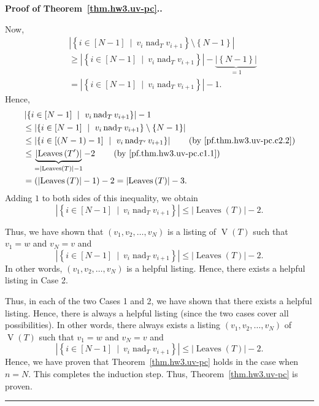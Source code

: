 \documentclass[numbers=enddot,12pt,final,onecolumn,notitlepage]{scrartcl}%
\theoremstyle{definition}
\newenvironment{proof}[1][Proof]{\noindent\textbf{#1.} }{\ \rule{0.5em}{0.5em}}
\newcommand{\set}[1]{\left\{ #1 \right\}}
\newcommand{\abs}[1]{\left| #1 \right|}
\newcommand{\tup}[1]{\left( #1 \right)}
\newcommand{\ive}[1]{\left[ #1 \right]}
\newcommand{\verts}[1]{\operatorname{V}\left( #1 \right)}
\newcommand{\leaves}[1]{\operatorname{Leaves}\left( #1 \right)}
\begin{document}
\begin{proof}[Proof of Theorem~\ref{thm.hw3.uv-pc}.]
\begin{itemize}
        Now,
        \begin{align*}
        &\abs{\set{i \in \ive{N-1} \ \mid \ v_i \operatorname{nad}_T v_{i+1} }
             \setminus \set{N-1}} \\
        &\geq \abs{\set{i \in \ive{N-1} \ \mid \ v_i \operatorname{nad}_T v_{i+1} }}
         - \underbrace{\abs{\set{N-1}}}_{= 1} \\
        &= \abs{\set{i \in \ive{N-1} \ \mid \ v_i \operatorname{nad}_T v_{i+1} }} - 1 .
        \end{align*}
        Hence, %
        \begin{align*}
        &\abs{\set{i \in \ive{N-1} \ \mid \ v_i \operatorname{nad}_T v_{i+1} }} - 1 \\
        &\leq \abs{\set{i \in \ive{N-1} \ \mid \ v_i \operatorname{nad}_T v_{i+1} }
             \setminus \set{N-1}} \\
        &\leq
        \abs{\set{i \in \ive{\tup{N-1}-1} \ \mid \ v_i \operatorname{nad}_{T'} v_{i+1} }}
        \qquad \left(\text{by \eqref{pf.thm.hw3.uv-pc.c2.2}}\right)
        \\
        &\leq
        \underbrace{\abs{\leaves{T'}}}_{= \abs{\leaves{T}} - 1} - 2
        \qquad \left(\text{by \eqref{pf.thm.hw3.uv-pc.c1.1}}\right) \\
        &= \tup{\abs{\leaves{T}} - 1} - 2 = \abs{\leaves{T}} - 3.
        \end{align*}
        Adding $1$ to both sides of this inequality, we obtain
        \[
        \abs{\set{i \in \ive{N-1} \ \mid \ v_i \operatorname{nad}_T v_{i+1} }}
        \leq \abs{\leaves{T}} - 2 .
        \]
        
        Thus, we have shown that $\tup{v_1, v_2, \ldots, v_N}$ is a
        listing of $\verts{T}$ such that $v_1 = w$ and $v_N = v$ and
        \[
        \abs{\set{i \in \ive{N-1} \ \mid \ v_i \operatorname{nad}_T v_{i+1} }}
        \leq \abs{\leaves{T}} - 2.
        \]
        In other words, $\tup{v_1, v_2, \ldots, v_N}$ is a helpful
        listing.
        Hence, there exists a helpful listing in Case 2.
\end{itemize}

Thus, in each of the two Cases 1 and 2, we have shown that there
exists a helpful listing.
Hence, there is always a helpful listing (since the two cases cover
all possibilities).
In other words, there always exists a listing
$\tup{v_1, v_2, \ldots, v_N}$ of
$\verts{T}$ such that $v_1 = w$ and $v_N = v$ and
\[
\abs{\set{i \in \ive{N-1} \ \mid \ v_i \operatorname{nad}_T v_{i+1} }}
\leq \abs{\leaves{T}} - 2.
\]
Hence, we have proven that Theorem~\ref{thm.hw3.uv-pc} holds in the
case when $n = N$.
This completes the induction step.
Thus, Theorem~\ref{thm.hw3.uv-pc} is proven.
\end{proof}
\end{document}
